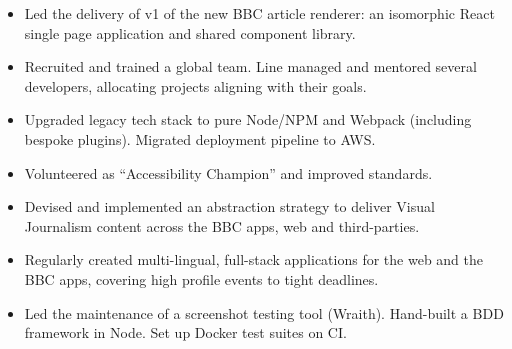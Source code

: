 \documentclass[10pt,a4paper,ragged2e,withhyper]{altacv}
\begin{document}
\begin{paracol}{2}
\divider

\begin{itemize}
    \item Led the delivery of v1 of the new BBC article renderer: an isomorphic React single page application and shared component library.
\end{itemize}

\divider


\begin{itemize}
    \item Recruited and trained a global team. Line managed and mentored several developers, allocating projects aligning with their goals.
    \item Upgraded legacy tech stack to pure Node/NPM and Webpack (including bespoke plugins). Migrated deployment pipeline to AWS.
    \item Volunteered as ``Accessibility Champion'' and improved standards.
\end{itemize}

\divider


\begin{itemize}
    \item Devised and implemented an abstraction strategy to deliver Visual Journalism content across the BBC apps, web and third-parties.
    \item Regularly created multi-lingual, full-stack applications for the web and the BBC apps, covering high profile events to tight deadlines.
\end{itemize}



\begin{itemize}
    \item Led the maintenance of a screenshot testing tool (Wraith). Hand-built a BDD framework in Node. Set up Docker test suites on CI.
\end{itemize}

\divider



\end{paracol}
\end{document}
